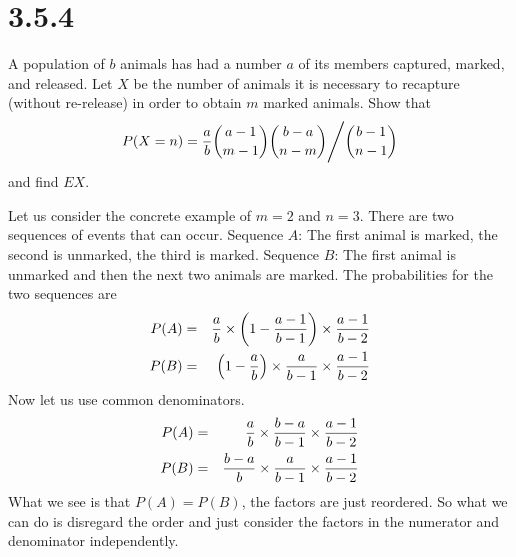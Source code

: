 \section*{3.5.4}
A population of $b$ animals has had a number $a$ of its members
captured, marked, and released.
Let $X$ be the number of animals it is necessary to recapture
(without re-release) in order to obtain $m$ marked animals.
Show that
$$P(X=n)={a\over b}
{a-1\choose m-1}
{b-a\choose n-m}
\Bigg/
{b-1\choose n-1}
$$
and find $EX$.

\bigskip
\noindent
Let us consider the concrete example of $m=2$ and $n=3$.
There are two sequences of events that can occur.
Sequence $A$: The first animal is marked, the second is
unmarked, the third is marked.
Sequence $B$: The first animal is unmarked and then the next
two animals are marked.
The probabilities for the two sequences are
\begin{eqnarray*}
P(A)&=&{a\over b}\times\left(1-{a-1\over b-1}\right)
\times{a-1\over b-2}
\\
P(B)&=&\left(1-{a\over b}\right)\times{a\over b-1}
\times{a-1\over b-2}
\end{eqnarray*}
Now let us use common denominators.
\begin{eqnarray*}
P(A)&=&{a\over b}\times{b-a\over b-1}
\times{a-1\over b-2}
\\
P(B)&=&{b-a\over b}\times{a\over b-1}
\times{a-1\over b-2}
\end{eqnarray*}
What we see is that $P(A)=P(B)$, the factors are just reordered.
So what we can do is disregard the order and just consider the
factors in the numerator and denominator independently.

